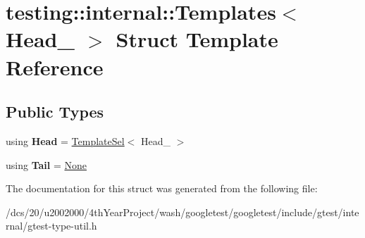 \hypertarget{structtesting_1_1internal_1_1Templates_3_01Head___01_4}{}\section{testing\+:\+:internal\+:\+:Templates$<$ Head\+\_\+ $>$ Struct Template Reference}
\label{structtesting_1_1internal_1_1Templates_3_01Head___01_4}
\subsection*{Public Types}
\begin{DoxyCompactItemize}
\item 
\mbox{\label{structtesting_1_1internal_1_1Templates_3_01Head___01_4_ac6c76b1c4a4da401cc0e50c247cdd568}} 
using {\bfseries Head} = \mbox{\hyperlink{structtesting_1_1internal_1_1TemplateSel}{Template\+Sel}}$<$ Head\+\_\+ $>$
\item 
\mbox{\label{structtesting_1_1internal_1_1Templates_3_01Head___01_4_a545ead14971baac1b876f7651c3529b9}} 
using {\bfseries Tail} = \mbox{\hyperlink{structtesting_1_1internal_1_1None}{None}}
\end{DoxyCompactItemize}


The documentation for this struct was generated from the following file\+:\begin{DoxyCompactItemize}
\item 
/dcs/20/u2002000/4th\+Year\+Project/wash/googletest/googletest/include/gtest/internal/gtest-\/type-\/util.\+h\end{DoxyCompactItemize}
